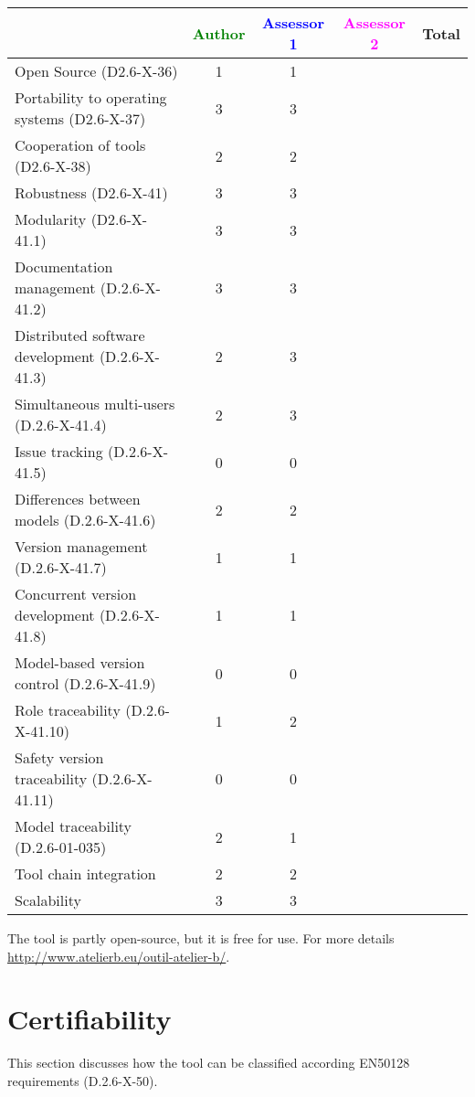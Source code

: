 \begin{tabular}{|l | c | c | c | c|}
\hline
& \textcolor{green}{Author} & \textcolor{blue}{Assessor 1} & \textcolor{magenta}{Assessor 2} & Total \\
\hline 
Open Source (D2.6-X-36) & 1 & 1 & &  \\
\hline 
Portability to operating systems (D2.6-X-37) & 3 & 3 & &  \\
\hline
Cooperation of tools (D2.6-X-38) & 2 & 2 & &  \\
\hline
Robustness (D2.6-X-41) & 3 & 3 & & \\
\hline
Modularity (D2.6-X-41.1) & 3 & 3 & & \\
\hline
Documentation management (D.2.6-X-41.2) & 3 & 3 & & \\
\hline
Distributed software development (D.2.6-X-41.3)  & 2 & 3 & & \\
\hline
Simultaneous multi-users (D.2.6-X-41.4)   & 2 & 3 & & \\
\hline
Issue tracking (D.2.6-X-41.5) & 0 & 0 & & \\
\hline
Differences between models (D.2.6-X-41.6) & 2 & 2 & & \\
\hline
Version management (D.2.6-X-41.7) & 1 & 1 & & \\
\hline
Concurrent version development (D.2.6-X-41.8) & 1 & 1 & & \\
\hline
Model-based version control (D.2.6-X-41.9) & 0 & 0 & & \\
\hline
Role traceability (D.2.6-X-41.10) & 1 & 2 & & \\
\hline
Safety version traceability (D.2.6-X-41.11) & 0 & 0 & & \\
\hline
Model traceability (D.2.6-01-035) & 2 & 1 & & \\
\hline
Tool chain integration & 2 & 2 & & \\
\hline
Scalability & 3 & 3 & & \\
\hline
\end{tabular}

\begin{author_comment}
The tool is partly open-source, but it is free for use.
For more details \url{http://www.atelierb.eu/outil-atelier-b/}.
\end{author_comment}


\section{Certifiability}

This section discusses how the tool can be classified according EN50128 requirements (D.2.6-X-50).


